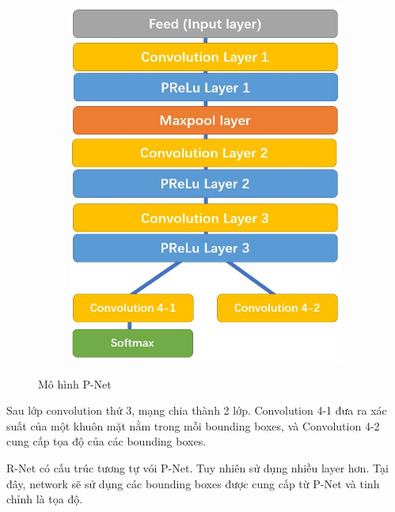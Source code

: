 \begin{figure}
    \begin{subfigure}{1.\textwidth}
        \begin{center}
            \includegraphics[width=0.6\linewidth]{Chapters/items/chap2_10.jpg}
        \end{center}
        \label{fig: chap2_10}
    \end{subfigure}
    \caption{Mô hình P-Net}
\end{figure}

\newpage
Sau lớp convolution thứ 3, mạng chia thành 2 lớp. Convolution 4-1 đưa ra xác suất của một khuôn mặt
nằm trong mỗi bounding boxes, và Convolution 4-2 cung cấp tọa độ của các bounding boxes.

R-Net có cấu trúc tương tự vói P-Net. Tuy nhiên sử dụng nhiều layer hơn.
Tại đây, network sẽ sử dụng các bounding boxes được cung cấp từ P-Net và tinh chỉnh là tọa độ.

